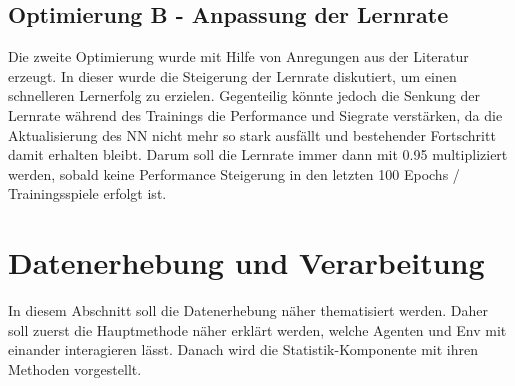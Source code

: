 \subsection{Optimierung B - Anpassung der Lernrate} \label{sec:Konzept_Optimierung02}
Die zweite Optimierung wurde mit Hilfe von Anregungen aus der Literatur \cite[S. 331 f.]{DRL_Lapan} erzeugt. In dieser wurde die Steigerung der Lernrate diskutiert, um einen schnelleren Lernerfolg zu erzielen. Gegenteilig könnte jedoch die Senkung der Lernrate während des Trainings die Performance und Siegrate verstärken, da die Aktualisierung des NN nicht mehr so stark ausfällt und bestehender Fortschritt damit erhalten bleibt. Darum soll die Lernrate immer dann mit 0.95 multipliziert werden, sobald keine Performance Steigerung in den letzten 100 Epochs / Trainingsspiele erfolgt ist.

\section{Datenerhebung und Verarbeitung} \label{sec:Konzept_Datenerhebung_Verarbeitung}
In diesem Abschnitt soll die Datenerhebung näher thematisiert werden. Daher soll zuerst die Hauptmethode näher erklärt werden, welche Agenten und Env mit einander interagieren lässt. Danach wird die Statistik-Komponente mit ihren Methoden vorgestellt.

